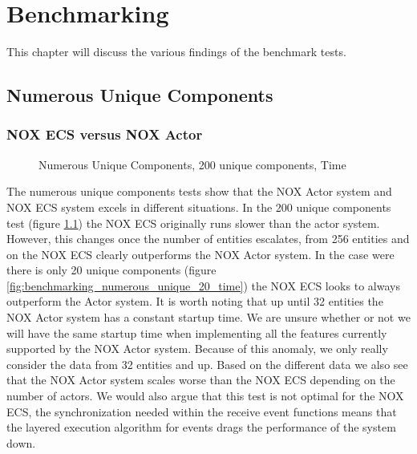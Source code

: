 \chapter{Benchmarking}
\label{chap:benchmarking}
This chapter will discuss the various findings of the benchmark tests.

\section{Numerous Unique Components}
\subsection{NOX ECS versus NOX Actor}
\begin{figure}[H]
\centering
{}
\caption[Numerous Components, ECS versus Actor, 200 Unique Components]{Numerous Unique Components, 200 unique components, Time}
\label{fig:benchmarking_numerous_unique_200_time}
\end{figure}

The numerous unique components tests show that the NOX Actor system and NOX ECS system excels in different situations.
In the 200 unique components test (figure \ref{fig:benchmarking_numerous_unique_200_time}) the NOX ECS originally runs slower than the actor system.
However, this changes once the number of entities escalates, from 256 entities and on the NOX ECS
clearly outperforms the NOX Actor system.
In the case were there is only 20 unique components (figure \ref{fig:benchmarking_numerous_unique_20_time}) the NOX ECS looks to always outperform the Actor system.
It is worth noting that up until 32 entities the NOX Actor system has a constant startup time.
We are unsure whether or not we will have the same startup time when implementing all the features currently
supported by the NOX Actor system.
Because of this anomaly, we only really consider the data from 32 entities and up.
Based on the different data we also see that the NOX Actor system scales worse than the NOX ECS depending on the number of actors.
We would also argue that this test is not optimal for the NOX ECS, the synchronization needed within the receive event functions
means that the layered execution algorithm for events drags the performance of the system down.

